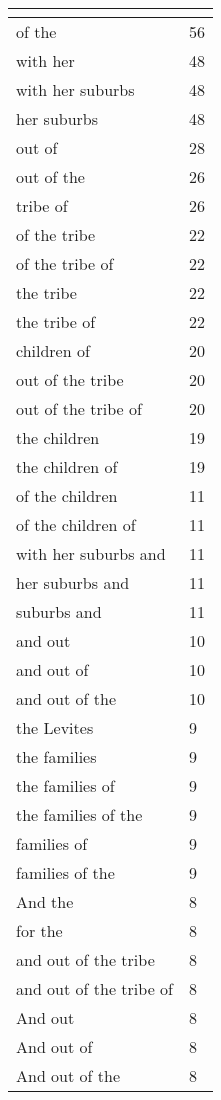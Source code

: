 \begin{center}
\begin{longtable}{|p{3.0in}|p{0.5in}|}
\hline \multicolumn{2}{c}{{ }} \\ \hline
\endfoot 
of the & 56\\ \hline 
with her & 48\\ \hline 
with her suburbs & 48\\ \hline 
her suburbs & 48\\ \hline 
out of & 28\\ \hline 
out of the & 26\\ \hline 
tribe of & 26\\ \hline 
of the tribe & 22\\ \hline 
of the tribe of & 22\\ \hline 
the tribe & 22\\ \hline 
the tribe of & 22\\ \hline 
children of & 20\\ \hline 
out of the tribe & 20\\ \hline 
out of the tribe of & 20\\ \hline 
the children & 19\\ \hline 
the children of & 19\\ \hline 
of the children & 11\\ \hline 
of the children of & 11\\ \hline 
with her suburbs and & 11\\ \hline 
her suburbs and & 11\\ \hline 
suburbs and & 11\\ \hline 
and out & 10\\ \hline 
and out of & 10\\ \hline 
and out of the & 10\\ \hline 
the Levites & 9\\ \hline 
the families & 9\\ \hline 
the families of & 9\\ \hline 
the families of the & 9\\ \hline 
families of & 9\\ \hline 
families of the & 9\\ \hline 
And the & 8\\ \hline 
for the & 8\\ \hline 
and out of the tribe & 8\\ \hline 
and out of the tribe of & 8\\ \hline 
And out & 8\\ \hline 
And out of & 8\\ \hline 
And out of the & 8\\ \hline 

\end{longtable}
\end{center}
